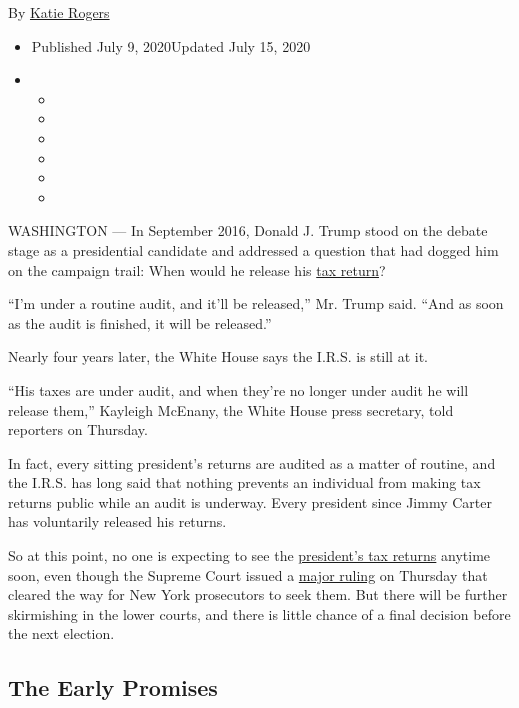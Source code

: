 By \href{https://www.nytimes.com/by/katie-rogers}{Katie Rogers}

\begin{itemize}
\item
  Published July 9, 2020Updated July 15, 2020
\item
  \begin{itemize}
  \item
  \item
  \item
  \item
  \item
  \item
  \end{itemize}
\end{itemize}

WASHINGTON --- In September 2016, Donald J. Trump stood on the debate
stage as a presidential candidate and addressed a question that had
dogged him on the campaign trail: When would he release his
\href{https://www.nytimes.com/2020/07/15/nyregion/donald-trump-taxes-cyrus-vance.html}{tax
return}?

``I'm under a routine audit, and it'll be released,'' Mr. Trump said.
``And as soon as the audit is finished, it will be released.''

Nearly four years later, the White House says the I.R.S. is still at it.

``His taxes are under audit, and when they're no longer under audit he
will release them,'' Kayleigh McEnany, the White House press secretary,
told reporters on Thursday.

In fact, every sitting president's returns are audited as a matter of
routine, and the I.R.S. has long said that nothing prevents an
individual from making tax returns public while an audit is underway.
Every president since Jimmy Carter has voluntarily released his returns.

So at this point, no one is expecting to see the
\href{https://www.nytimes.com/2020/08/03/nyregion/donald-trump-taxes-cyrus-vance.html}{president's
tax returns} anytime soon, even though the Supreme Court issued a
\href{https://www.nytimes.com/2020/07/09/us/trump-taxes-supreme-court.html}{major
ruling} on Thursday that cleared the way for New York prosecutors to
seek them. But there will be further skirmishing in the lower courts,
and there is little chance of a final decision before the next election.

\hypertarget{the-early-promises}{%
\subsection{The Early Promises}\label{the-early-promises}}

